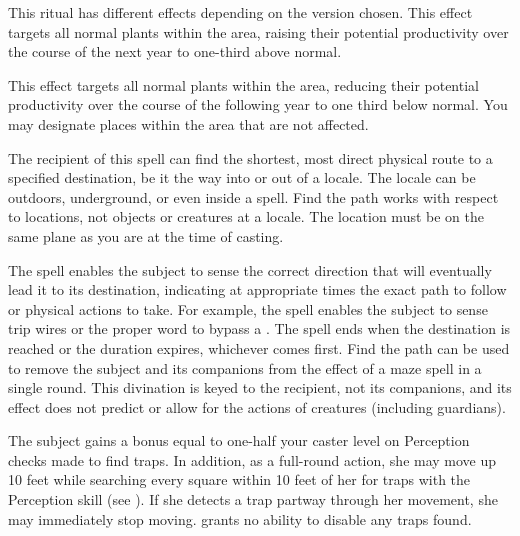 \spelleffect This ritual has different effects depending on the version chosen.
 This effect targets all normal plants within the area, raising their potential productivity over the course of the next year to one-third above normal.
\par {} This effect targets all normal plants within the area, reducing their potential productivity over the course of the following year to one third below normal.
\spellnotes You may designate places within the area that are not affected.

\spelldur{\durext \dismissable}
\spelleffect The recipient of this spell can find the shortest, most direct physical route to a specified destination, be it the way into or out of a locale. The locale can be outdoors, underground, or even inside a  spell. Find the path works with respect to locations, not objects or creatures at a locale. The location must be on the same plane as you are at the time of casting.
\par The spell enables the subject to sense the correct direction that will eventually lead it to its destination, indicating at appropriate times the exact path to follow or physical actions to take. For example, the spell enables the subject to sense trip wires or the proper word to bypass a . The spell ends when the destination is reached or the duration expires, whichever comes first. Find the path can be used to remove the subject and its companions from the effect of a maze spell in a single round.
\spellnotes This divination is keyed to the recipient, not its companions, and its effect does not predict or allow for the actions of creatures (including guardians).

\spelldur{\durmed}
\spelleffect The subject gains a bonus equal to one-half your caster level on Perception checks made to find traps. In addition, as a full-round action, she may move up 10 feet while searching every square within 10 feet of her for traps with the Perception skill (see ). If she detects a trap partway through her movement, she may immediately stop moving.
\spellnotes {} grants no ability to disable any traps found.

